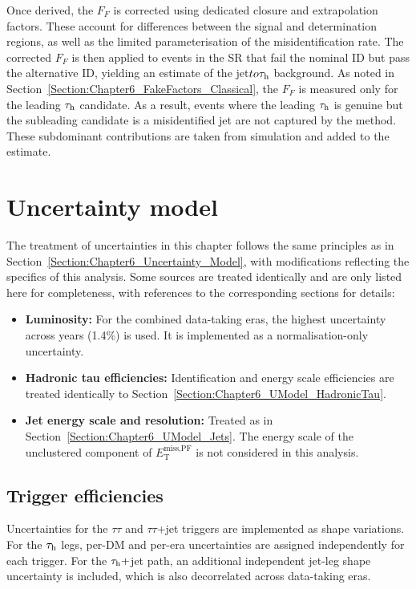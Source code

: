 Once derived, the $F_F$ is corrected using dedicated closure and extrapolation factors. These account for differences between the signal and determination regions, as well as the limited parameterisation of the misidentification rate. The corrected $F_F$ is then applied to events in the \ac{SR} that fail the nominal ID but pass the alternative ID, yielding an estimate of the jet$to\tau_\mathrm{h}$ background. As noted in Section~\ref{Section:Chapter6_FakeFactors_Classical}, the $F_F$ is measured only for the leading $\tau_\mathrm{h}$ candidate. As a result, events where the leading $\tau_\mathrm{h}$ is genuine but the subleading candidate is a misidentified jet are not captured by the method. These subdominant contributions are taken from simulation and added to the estimate.

\section{Uncertainty model}
\label{Section:Chapter7_UncertaintyModel}

The treatment of uncertainties in this chapter follows the same principles as in Section~\ref{Section:Chapter6_Uncertainty_Model}, with modifications reflecting the specifics of this analysis. Some sources are treated identically and are only listed here for completeness, with references to the corresponding sections for details:

\begin{itemize}
  \item \textbf{Luminosity:} For the combined data-taking eras, the highest uncertainty across years (1.4\%) is used. It is implemented as a normalisation-only uncertainty.
  \item \textbf{Hadronic tau efficiencies:} Identification and energy scale efficiencies are treated identically to Section~\ref{Section:Chapter6_UModel_HadronicTau}.
  \item \textbf{Jet energy scale and resolution:} Treated as in Section~\ref{Section:Chapter6_UModel_Jets}. The energy scale of the unclustered component of $E_{\mathrm{T}}^{\text{miss,PF}}$ is not considered in this analysis.
\end{itemize}


\subsection{Trigger efficiencies}

Uncertainties for the $\tau\tau$ and $\tau\tau$+jet triggers are implemented as shape variations. For the $\tau_\mathrm{h}$ legs, per-DM and per-era uncertainties are assigned independently for each trigger. For the $\tau_\mathrm{h}{+}$jet path, an additional independent jet-leg shape uncertainty is included, which is also decorrelated across data-taking eras. 

